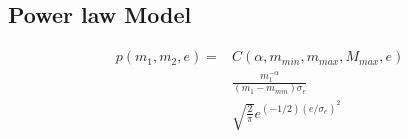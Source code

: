 \documentclass[twocolumn,prd,nofootinbib]{revtex4}
\newcommand\Y[1]{{{}_{#1}Y}}
\begin{document}
\subsection{Power law Model}


\begin{align}
\label{eq:plaw}
p(m_1,m_2,e) = &C(\alpha,m_{min},m_{max},M_{max},e)  
\nonumber \\ & \frac{m_1^{-\alpha}}{(m_1-m_{min})\sigma_e} 
\nonumber \\ &
\sqrt{\frac{2}{\pi}} e^{(-1/2)(e/\sigma_e)^2}
\end{align}

   






\end{document}
